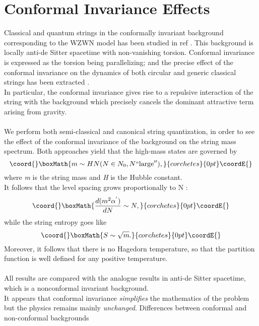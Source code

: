\documentclass[12pt,a4paper]{article}
\begin{document}
\section{Conformal Invariance Effects}
Classical and quantum strings in the conformally invariant background 
corresponding to the \coordHE{} WZWN model has been studied in ref \cite{vls3}. 
This background is locally anti-de Sitter spacetime with non-vanishing 
torsion. Conformal invariance is expressed as the torsion being parallelizing; 
and the precise effect of the conformal invariance on the dynamics of both 
circular and generic classical strings has been extracted \cite{vls3}. \\ 
In 
particular, the conformal invariance gives rise to a repulsive interaction of 
the string with the background which precisely cancels the dominant attractive 
term arising from gravity. \\ \\
We perform both semi-classical and canonical string quantization, in order to 
see the effect of the conformal invariance of the background on the string 
mass spectrum. Both approaches yield that the high-mass states are governed 
by 
\begin{displaymath}\coord{}\boxMath{
m \sim HN (N \in N_0, N ``\mathrm {large}''), 
}{corchetes}{0pt}\coordE{}\end{displaymath}
where {\it m} is the string mass and {\it H} is the Hubble constant. \\
It follows that the level spacing grows proportionally to N :
\begin{displaymath}\coord{}\boxMath{
\frac {d (m^2 \alpha ^{'})}{dN} \sim N, 
}{corchetes}{0pt}\coordE{}\end{displaymath}
while the string entropy goes like 
\begin{displaymath}\coord{}\boxMath{
S \sim \sqrt{m}.
}{corchetes}{0pt}\coordE{}\end{displaymath}
Moreover, it follows that there is no Hagedorn temperature, so that the 
partition function is well defined for any positive temperature. \\ \\
All results are compared with the analogue results in anti-de Sitter spacetime, which is a nonconformal invariant background.\\It appears that conformal 
invariance 
{\it simplifies} the mathematics of the problem but the physics remains mainly 
{\it unchanged}. Differences between conformal and non-conformal backgrounds 
\end{document}
